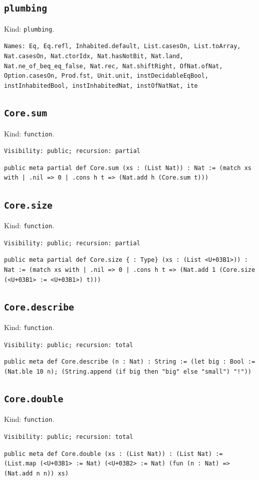 \documentclass[11pt]{article}
\begin{document}
\subsection*{\texttt{plumbing}}
\noindent Kind: \texttt{plumbing}.\par
\noindent \texttt{Names: Eq, Eq.refl, Inhabited.default, List.casesOn, List.toArray, Nat.casesOn, Nat.ctorIdx, Nat.hasNotBit, Nat.land, Nat.ne\_of\_beq\_eq\_false, Nat.rec, Nat.shiftRight, OfNat.ofNat, Option.casesOn, Prod.fst, Unit.unit, instDecidableEqBool, instInhabitedBool, instInhabitedNat, instOfNatNat, ite}\par
\subsection*{\texttt{Core.sum}}
\noindent Kind: \texttt{function}.\par
\noindent \texttt{Visibility: public; recursion: partial}\par
\noindent \texttt{public meta partial def Core.sum (xs : (List Nat)) : Nat :=   (match xs with | .nil => 0 | .cons h t => (Nat.add h (Core.sum t)))}\par
\subsection*{\texttt{Core.size}}
\noindent Kind: \texttt{function}.\par
\noindent \texttt{Visibility: public; recursion: partial}\par
\noindent \texttt{public meta partial def Core.size \{<U+03B1> : Type\} (xs : (List <U+03B1>)) : Nat :=   (match xs with | .nil => 0 | .cons h t => (Nat.add 1 (Core.size (<U+03B1> := <U+03B1>) t)))}\par
\subsection*{\texttt{Core.describe}}
\noindent Kind: \texttt{function}.\par
\noindent \texttt{Visibility: public; recursion: total}\par
\noindent \texttt{public meta def Core.describe (n : Nat) : String :=   (let big : Bool := (Nat.ble 10 n); (String.append (if big then "big" else "small") "!"))}\par
\subsection*{\texttt{Core.double}}
\noindent Kind: \texttt{function}.\par
\noindent \texttt{Visibility: public; recursion: total}\par
\noindent \texttt{public meta def Core.double (xs : (List Nat)) : (List Nat) :=   (List.map (<U+03B1> := Nat) (<U+03B2> := Nat) (fun (n : Nat) => (Nat.add n n)) xs)}\par
\end{document}
